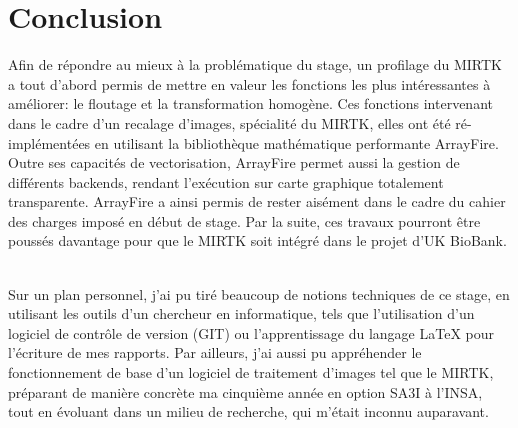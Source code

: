 \documentclass[10pt]{report}
\begin{document}
\chapter*{Conclusion} 
Afin de répondre au mieux à la problématique du stage, un profilage du MIRTK a tout d'abord permis de mettre en valeur les fonctions les plus intéressantes à améliorer: le floutage et la transformation homogène. Ces fonctions intervenant dans le cadre d'un recalage d'images, spécialité du MIRTK, elles ont été ré-implémentées en utilisant la bibliothèque mathématique performante ArrayFire. Outre ses capacités de vectorisation, ArrayFire permet aussi la gestion de différents backends, rendant l'exécution sur carte graphique totalement transparente. ArrayFire a ainsi permis de rester aisément dans le cadre du cahier des charges imposé en début de stage. Par la suite, ces travaux pourront être poussés davantage pour que le MIRTK soit intégré dans le projet d'UK BioBank.\\ ~\par
\noindent
Sur un plan personnel, j'ai pu tiré beaucoup de notions techniques de ce stage, en utilisant les outils d'un chercheur en informatique, tels que l'utilisation d'un logiciel de contrôle de version (GIT) ou l'apprentissage du langage LaTeX pour l'écriture de mes rapports. Par ailleurs, j'ai aussi pu appréhender le fonctionnement de base d'un logiciel de traitement d'images tel que le MIRTK, préparant de manière concrète ma cinquième année en option SA3I à l'INSA, tout en évoluant dans un milieu de recherche, qui m'était inconnu auparavant.
\end{document}
